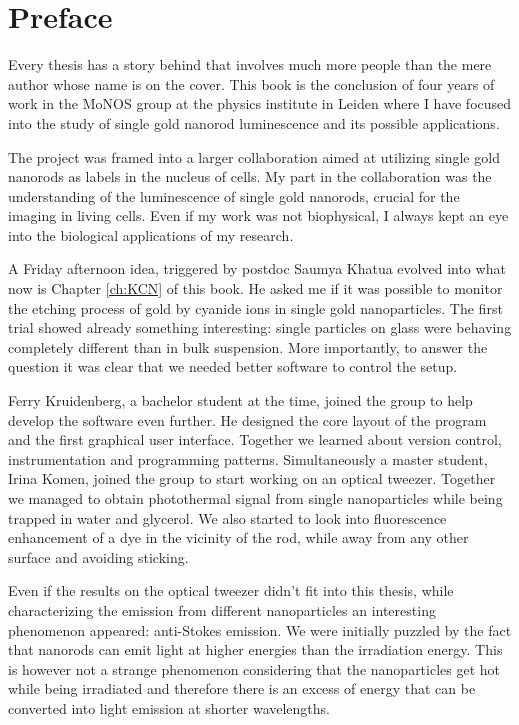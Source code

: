 \chapter*{Preface}

Every thesis has a story behind that involves much more people than the mere
author whose name is on the cover. This book is the conclusion of four years of
work in the MoNOS group at the physics institute in Leiden where I have focused
into the study of single gold nanorod luminescence and its possible applications. 

The project was framed into a larger collaboration aimed at utilizing single
gold nanorods as labels in the nucleus of cells. My part in the collaboration
was the understanding of the luminescence of single gold nanorods, crucial for
the imaging in living cells. Even if my work was not biophysical, I always kept
an eye into the biological applications of my research.

A Friday afternoon idea, triggered by postdoc Saumya Khatua evolved into what
now is Chapter \ref{ch:KCN} of this book. He asked me if it was possible to
monitor the etching process of gold by cyanide ions in single gold
nanoparticles. The first trial showed already something interesting: single
particles on glass were behaving completely different than in bulk suspension.
More importantly, to answer the question it was clear that we needed better
software to control the setup.

Ferry Kruidenberg, a bachelor student at the time, joined the group to help
develop the software even further. He designed the core layout of the program
and the first graphical user interface. Together we learned about version
control, instrumentation and programming patterns. Simultaneously a master
student, Irina Komen, joined the group to start working on an optical tweezer.
Together we managed to obtain photothermal signal from single nanoparticles
while being trapped in water and glycerol. We also started to look into
fluorescence enhancement of a dye in the vicinity of the rod, while away from
any other surface and avoiding sticking.

Even if the results on the optical tweezer didn't fit into this thesis, while
characterizing the emission from different nanoparticles an interesting
phenomenon appeared: anti-Stokes emission. We were initially puzzled by the fact
that nanorods can emit light at higher energies than the irradiation energy.
This is however not a strange phenomenon considering that the nanoparticles get
hot while being irradiated and therefore there is an excess of energy that can
be converted into light emission at shorter wavelengths.

